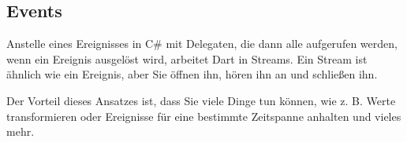 \subsection{Events}
Anstelle eines Ereignisses in C\# mit Delegaten, die dann alle aufgerufen werden, wenn ein Ereignis ausgelöst wird, arbeitet Dart in Streams. Ein Stream ist ähnlich wie ein Ereignis, aber Sie öffnen ihn, hören ihn an und schließen ihn.

Der Vorteil dieses Ansatzes ist, dass Sie viele Dinge tun können, wie z. B. Werte transformieren oder Ereignisse für eine bestimmte Zeitspanne anhalten und vieles mehr. 



